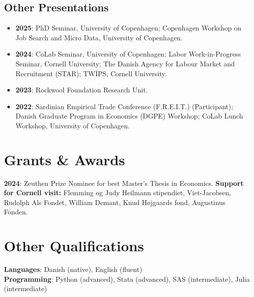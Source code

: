 \documentclass[12pt,a4paper]{article}
\newlength{\cvindent}
\newenvironment{cvbody}{%
  \begin{adjustwidth}{\cvindent}{}%
  \setlength{\parindent}{0pt}%
}{%
  \end{adjustwidth}%
}
\begin{document}
\subsection*{\normalsize Other Presentations}
\begin{cvbody}
\begin{itemize}[leftmargin=1.5em, labelsep=0.5em, itemsep=4pt, parsep=0pt]
    \item \textbf{2025}: PhD Seminar, University of Copenhagen; Copenhagen Workshop on Job Search and Micro Data, University of Copenhagen.
    \item \textbf{2024}: CoLab Seminar, University of Copenhagen; Labor Work-in-Progress Seminar, Cornell University; The Danish Agency for Labour Market and Recruitment (STAR); TWIPS, Cornell University.
    \item \textbf{2023}: Rockwool Foundation Research Unit.
    \item \textbf{2022}: Sardinian Empirical Trade Conference (F.R.E.I.T.) (Participant); Danish Graduate Program in Economics (DGPE) Workshop; CoLab Lunch Workshop, University of Copenhagen.
\end{itemize}
\end{cvbody}

\section{Grants \& Awards}
\begin{cvbody}
\textbf{2024}: Zeuthen Prize Nominee for best Master's Thesis in Economics. \textbf{Support for Cornell visit:} Flemming og Judy Heilmann stipendiet, Viet-Jacobsen, Rudolph Als Fondet, William Demant, Knud Højgaards fond, Augustinus Fonden.
\end{cvbody}

\section{Other Qualifications}
\begin{cvbody}
\textbf{Languages}: Danish (native), English (fluent) \\
\textbf{Programming}: Python (advanced), Stata (advanced), SAS (intermediate), Julia (intermediate)
\end{cvbody}
\end{document}
